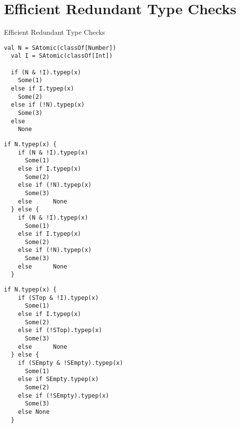 \section{Efficient Redundant Type Checks}

\begin{frame}{Efficient Redundant Type Checks}
\end{frame}


\newsavebox\typecaseAbox
\begin{lrbox}{\typecaseAbox}
  \begin{minipage}{8cm}
\begin{lstlisting}[style=scalaioScala]
  val N = SAtomic(classOf[Number])
  val I = SAtomic(classOf[Int])

  if (N & !I).typep(x)
    Some(1)
  else if I.typep(x)
    Some(2)
  else if (!N).typep(x)
    Some(3)
  else
    None
\end{lstlisting}
  \end{minipage}
\end{lrbox}

\newsavebox\typecaseBbox
\begin{lrbox}{\typecaseBbox}
  \begin{minipage}{8cm}
\begin{lstlisting}[style=scalaioScala]
  if N.typep(x) {
    if (N & !I).typep(x)
      Some(1)
    else if I.typep(x)
      Some(2)
    else if (!N).typep(x)
      Some(3)
    else      None
  } else {
    if (N & !I).typep(x)
      Some(1)
    else if I.typep(x)
      Some(2)
    else if (!N).typep(x)
      Some(3)
    else      None
  }
\end{lstlisting}
  \end{minipage}
\end{lrbox}

\newsavebox\typecaseCbox
\begin{lrbox}{\typecaseCbox}
  \begin{minipage}{6cm}
\begin{lstlisting}[style=scalaioScala]
  if N.typep(x) {
    if (STop & !I).typep(x)
      Some(1)
    else if I.typep(x)
      Some(2)
    else if (!STop).typep(x)
      Some(3)
    else      None
  } else {
    if (SEmpty & !SEmpty).typep(x)
      Some(1)
    else if SEmpty.typep(x)
      Some(2)
    else if (!SEmpty).typep(x)
      Some(3)
    else None
  }
\end{lstlisting}
  \end{minipage}
\end{lrbox}

